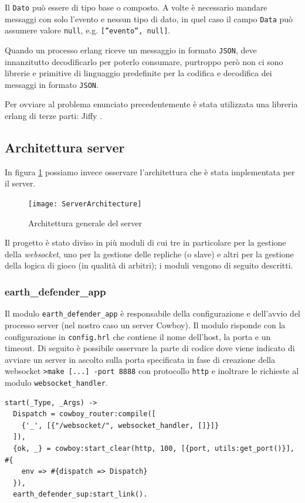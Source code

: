 \documentclass[paper=a4, fontsize=11pt]{scrartcl} %
\numberwithin{equation}{section} %
\numberwithin{figure}{section} %
\numberwithin{table}{section} %
\begin{document}
Il \texttt{Dato} può essere di tipo base o composto.
A volte è necessario mandare messaggi con solo l'evento e nessun tipo di dato, in quel caso il campo \texttt{Data} può assumere valore \texttt{null}, e.g. \texttt{[''evento'', null]}.

Quando un processo erlang riceve un messaggio in formato \texttt{JSON}, deve innanzitutto decodificarlo per poterlo consumare, purtroppo però non ci sono librerie e primitive di linguaggio predefinite per la codifica e decodifica dei messaggi in formato \texttt{JSON}.

Per ovviare al problema enunciato precedentemente è stata utilizzata una libreria erlang di terze parti: Jiffy \cite{jiffy}.


\subsection{Architettura server}
In figura \ref{ServerArc} possiamo invece osservare l'architettura che è stata implementata per il server.

\begin{figure}
\centering
\texttt{[image: ServerArchitecture]}
\caption{Architettura generale del server}
\label{ServerArc}
\end{figure}

Il progetto è stato diviso in più moduli di cui tre in particolare per la gestione della \textit{websocket}, uno per la gestione delle repliche (o slave) e altri per la gestione della logica di gioco (in qualità di arbitri); i moduli vengono di seguito descritti.

\subsubsection{earth\_defender\_app}
Il modulo \texttt{earth\_defender\_app} è responsabile della configurazione e dell'avvio del processo server (nel nostro caso un server Cowboy). Il modulo risponde con la configurazione in \texttt{config.hrl} che contiene il nome dell'host, la porta e un timeout.
Di seguito è possibile osservare la parte di codice dove viene indicato di avviare un server in ascolto sulla porta specificata in fase di creazione della websocket \texttt{>make [...] -port 8888} con protocollo \texttt{http} e inoltrare le richieste al modulo \texttt{websocket\_handler}.
\begin{lstlisting}[basicstyle=\footnotesize]
start(_Type, _Args) ->
  Dispatch = cowboy_router:compile([
    {'_', [{"/websocket/", websocket_handler, []}]}
  ]),
  {ok, _} = cowboy:start_clear(http, 100, [{port, utils:get_port()}], #{
    env => #{dispatch => Dispatch}
  }),
  earth_defender_sup:start_link().
\end{lstlisting}
\end{document}
